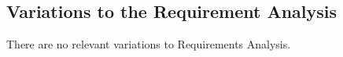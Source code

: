 \subsection{Variations to the Requirement Analysis}

There are no relevant variations to Requirements Analysis.